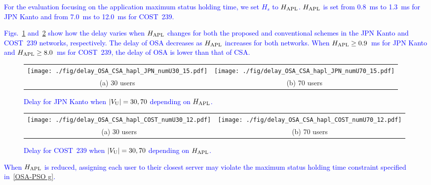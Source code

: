 \documentclass[10pt, letterpaper]{IEEEtran}
\newcommand\blue[1]{\textcolor{blue}{#1}}
\begin{document}
\begin{CJK}{UTF8}{ipxm}
\blue{
For the evaluation focusing on the application maximum status holding time, we set $H_s$ to $H_{\rm APL}$.
$H_{\rm APL}$ is set from 0.8~ms to 1.3~ms for JPN Kanto and from 7.0~ms to 12.0~ms for COST~239.
}

\blue{
Figs.~\ref{fig:delay_OSA_CSA_hapl_JPN} and~\ref{fig:delay_OSA_CSA_hapl_COST} show how the delay varies when $H_{\rm APL}$ changes for both the proposed and conventional schemes in the JPN Kanto and COST~239 networks, respectively.
The delay of OSA decreases as $H_{\rm APL}$ increases for both networks.
When $H_{\rm APL} \geq 0.9$~ms for JPN Kanto and $H_{\rm APL} \geq 8.0$~ms for COST~239, the delay of OSA is lower than that of CSA.
}
\begin{figure}[t]
  \begin{center}
      \begin{tabular}{cc}
      \texttt{[image: ./fig/delay\_OSA\_CSA\_hapl\_JPN\_numU30\_15.pdf]} &
      \texttt{[image: ./fig/delay\_OSA\_CSA\_hapl\_JPN\_numU70\_15.pdf]} \\
      (a) 30 users & (b) 70 users
      \end{tabular}
  \end{center}
  \caption{\blue{Delay for JPN Kanto when $|V_{\rm U}| = 30, 70$ depending on $H_{\rm APL}$.}}
  \label{fig:delay_OSA_CSA_hapl_JPN}
\end{figure}
\begin{figure}[t]
  \begin{center}
      \begin{tabular}{cc}
      \texttt{[image: ./fig/delay\_OSA\_CSA\_hapl\_COST\_numU30\_12.pdf]} &
      \texttt{[image: ./fig/delay\_OSA\_CSA\_hapl\_COST\_numU70\_12.pdf]} \\
      (a) 30 users & (b) 70 users
      \end{tabular}
  \end{center}
  \caption{\blue{Delay for COST~239 when $|V_{\rm U}| = 30, 70$ depending on $H_{\rm APL}$.}}
  \label{fig:delay_OSA_CSA_hapl_COST}
\end{figure}
\blue{
When $H_{\rm APL}$ is reduced, assigning each user to their closest server may violate the maximum status holding time constraint specified in~\eqref{OSA-PSO g}.
}
\end{CJK}
\end{document}
